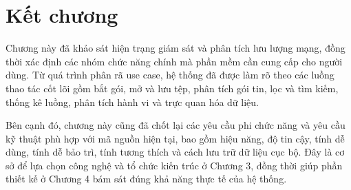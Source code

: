 \documentclass[../DoAn.tex]{subfiles}
\begin{document}
\section{Kết chương}
Chương này đã khảo sát hiện trạng giám sát và phân tích lưu lượng mạng, đồng thời xác định các nhóm chức năng chính mà phần mềm cần cung cấp cho người dùng. Từ quá trình phân rã use case, hệ thống đã được làm rõ theo các luồng thao tác cốt lõi gồm bắt gói, mở và lưu tệp, phân tích gói tin, lọc và tìm kiếm, thống kê luồng, phân tích hành vi và trực quan hóa dữ liệu.

Bên cạnh đó, chương này cũng đã chốt lại các yêu cầu phi chức năng và yêu cầu kỹ thuật phù hợp với mã nguồn hiện tại, bao gồm hiệu năng, độ tin cậy, tính dễ dùng, tính dễ bảo trì, tính tương thích và cách lưu trữ dữ liệu cục bộ. Đây là cơ sở để lựa chọn công nghệ và tổ chức kiến trúc ở Chương 3, đồng thời giúp phần thiết kế ở Chương 4 bám sát đúng khả năng thực tế của hệ thống.
\end{document}

